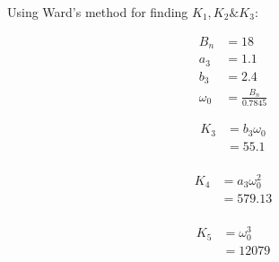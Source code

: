 Using Ward's method\cite{Ward} for finding $K_1,K_2 \& K_3$:

\begin{align*}
B_n &= 18\\
a_3&=1.1\\
b_3&=2.4\\
\omega_{0}&=\frac{B_n}{0.7845}
\end{align*}

\begin{equation} \label{eq3}
\begin{split}
K_3 & = b_3  \omega_{0}\\
    & = 55.1\\
\end{split}
\end{equation}

\begin{equation} \label{eq4}
\begin{split}
K_4 & = a_3  \omega_{0}^2\\ 
    & = 579.13\\
\end{split}
\end{equation}

\begin{equation} \label{eq5}
\begin{split}
K_5 & = \omega_{0}^3\\
    & = 12079\\
\end{split}
\end{equation}


\begin{comment}
The next stage of Laplace domain analysis after determining the transfer function of the filter is to determine the transfer function of the closed loop system.

Multiplying equation \ref{eq6} by $\frac{s^2}{s^2}$ we get :

\begin{equation}
F(s) = \frac{K_3s^2 + K_4 s + K_5}{s^2}
\end{equation}

The \ac{VCO} has the following transfer function : $G(s) = \frac{K_{vco}}{s}$


\begin{equation}
 H(s) = \frac{K_{VCO}(K_1 + \frac{K_2}{s} + \frac{K_3}{s^2})}{s+K_{VCO}(K_1 + \frac{K_2}{s} + \frac{K_3}{s^2})}
\end{equation}

Multiplying by $\frac{s^2}{s^2}$ we get :

\begin{equation}
 H(s) = \frac{K_{VCO}(K_1s^2 + K_2s + K_3)}{s^3+K_{VCO}(K_1s^2 + K_2s + K_3)}
 \end{equation}
\end{comment}


